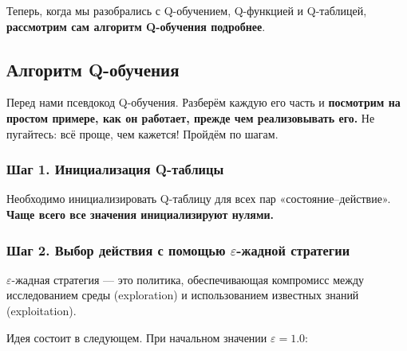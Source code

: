 \documentclass[11pt,a4paper]{article}
\begin{document}
Теперь, когда мы разобрались с Q-обучением, Q-функцией и Q-таблицей, \textbf{рассмотрим сам алгоритм Q-обучения подробнее}.

\subsection{Алгоритм Q-обучения}\label{the-q-learning-algorithm}

Перед нами псевдокод Q-обучения. Разберём каждую его часть и \textbf{посмотрим на простом примере, как он работает, прежде чем реализовывать его.} Не пугайтесь: всё проще, чем кажется! Пройдём по шагам.


\subsubsection{Шаг 1. Инициализация Q-таблицы}\label{step-1-we-initialize-the-q-table}


Необходимо инициализировать Q-таблицу для всех пар «состояние--действие». \textbf{Чаще всего все значения инициализируют нулями.}

\subsubsection{\texorpdfstring{Шаг 2. Выбор действия с помощью \(\varepsilon\)-жадной стратегии}{Шаг 2. Выбор действия с помощью epsilon-жадной стратегии}}\label{step-2-choose-an-action-using-the-epsilon-greedy-strategy}


\(\varepsilon\)-жадная стратегия --- это политика, обеспечивающая компромисс между исследованием среды (exploration) и использованием известных знаний (exploitation).

Идея состоит в следующем. При начальном значении \(\varepsilon=1.0\):
\end{document}
